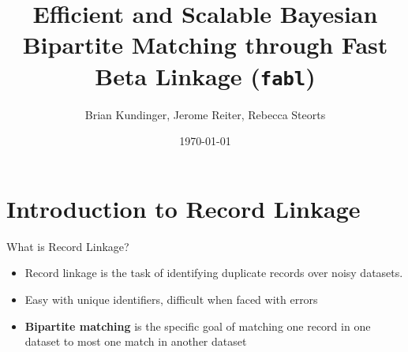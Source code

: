 \documentclass{beamer}
\begin{document}
	\title{Efficient and Scalable Bayesian Bipartite Matching through Fast Beta Linkage (\texttt{fabl})}
	\author{Brian Kundinger, Jerome Reiter, Rebecca Steorts}
	\date{\today}
	

	
	\begin{frame}
		\titlepage
	\end{frame}


\section{Introduction to Record Linkage}

	\begin{frame}{What is Record Linkage?}
	\begin{itemize}
		\item Record linkage is the task of identifying duplicate records over noisy datasets.
		
		\item Easy with unique identifiers, difficult when faced with errors
		
		\item \textbf{Bipartite matching} is the specific goal of matching one record in one dataset to most one match in another dataset
	\end{itemize}
	\end{frame}


%			
\end{document}
